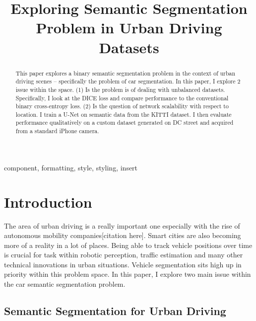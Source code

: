 \documentclass[Location Location Location! : Exploring Image Segmentation Problem In Urban Driving Scenarios]{IEEEtran}
\begin{document}
\title{Exploring Semantic Segmentation Problem in Urban Driving Datasets\\

}

\author{
}

\maketitle

\begin{abstract}
This paper explores a binary semantic segmentation problem in the context of urban driving scenes -- specifically the problem of car segmentation. In this paper, I explore 2 issue within the space. (1) Is the problem is of dealing with unbalanced datasets. Specifically, I look at the DICE loss and compare performance to the conventional binary cross-entropy loss. (2) Is the question of network scalability with respect to location. I train a U-Net on semantic data from the KITTI \cite{kitti} dataset. I then evaluate performance qualitatively on a custom dataset generated on DC street and acquired from a standard iPhone camera.


\end{abstract}

\begin{IEEEkeywords}
component, formatting, style, styling, insert
\end{IEEEkeywords}

\section{Introduction}

The area of urban driving is a really important one especially with the rise of autonomous mobility companies[citation here]. Smart cities are also becoming more of a reality in a lot of places. Being able to track vehicle positions over time is crucial for task within robotic perception, traffic estimation and many other technical innovations in urban situations. Vehicle segmentation sits high up in priority within this problem space. In this paper, I explore two main issue within the car semantic segmentation problem. 

\subsection{Semantic Segmentation for Urban Driving}
\end{document}
